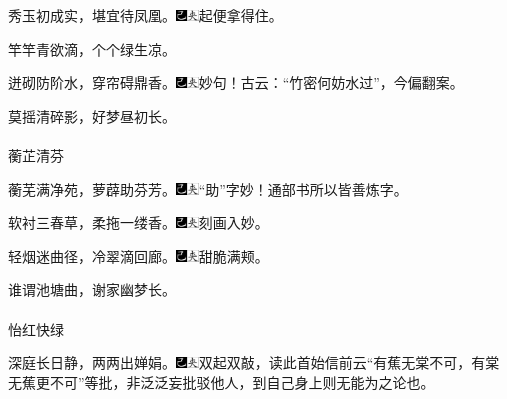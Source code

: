 秀玉初成实，堪宜待凤凰。{\includegraphics[width=3mm]{../Images/00003}\includegraphics[width=3mm]{../Images/00012}\footnotesize \kaishu 起便拿得住。}

竿竿青欲滴，个个绿生凉。

迸砌防阶水，穿帘碍鼎香。{\includegraphics[width=3mm]{../Images/00003}\includegraphics[width=3mm]{../Images/00012}\footnotesize \kaishu 妙句！古云：“竹密何妨水过”，今偏翻案。}

莫摇清碎影，好梦昼初长。
\\
\\
\indent
蘅芷清芬

蘅芜满净苑，萝薜助芬芳。{\includegraphics[width=3mm]{../Images/00003}\includegraphics[width=3mm]{../Images/00012}\footnotesize \kaishu “助”字妙！通部书所以皆善炼字。}

软衬三春草，柔拖一缕香。{\includegraphics[width=3mm]{../Images/00003}\includegraphics[width=3mm]{../Images/00012}\footnotesize \kaishu 刻画入妙。}

轻烟迷曲径，冷翠滴回廊。{\includegraphics[width=3mm]{../Images/00003}\includegraphics[width=3mm]{../Images/00012}\footnotesize \kaishu 甜脆满颊。}

谁谓池塘曲，谢家幽梦长。
\\
\\
\indent
怡红快绿

深庭长日静，两两出婵娟。{\includegraphics[width=3mm]{../Images/00003}\includegraphics[width=3mm]{../Images/00012}\footnotesize \kaishu 双起双敲，读此首始信前云“有蕉无棠不可，有棠无蕉更不可”等批，非泛泛妄批驳他人，到自己身上则无能为之论也。}

